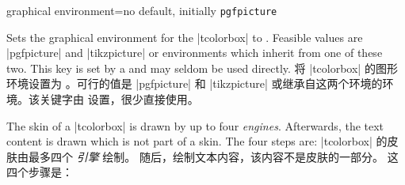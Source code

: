 \begin{docTcbKey}{graphical environment}{=}{no default, initially \texttt{pgfpicture}}
\begin{stripedbox}
Sets the graphical environment for the |tcolorbox| to .
Feasible values are |pgfpicture| and |tikzpicture| or environments which inherit from one of these two. 
This key is set by a  and may seldom be used directly.
\tcblower
将 |tcolorbox| 的图形环境设置为 。可行的值是 |pgfpicture| 和 |tikzpicture| 或继承自这两个环境的环境。该关键字由  设置，很少直接使用。
\end{stripedbox}
\end{docTcbKey}

\begin{stripedbox}
The skin of a |tcolorbox| is drawn by up to four \emph{engines}.
Afterwards, the text content is drawn which is not part of a skin.
The four steps are:
\tcblower
|tcolorbox| 的皮肤由最多四个 \emph{引擎} 绘制。 随后，绘制文本内容，该内容不是皮肤的一部分。 这四个步骤是：
\end{stripedbox}

